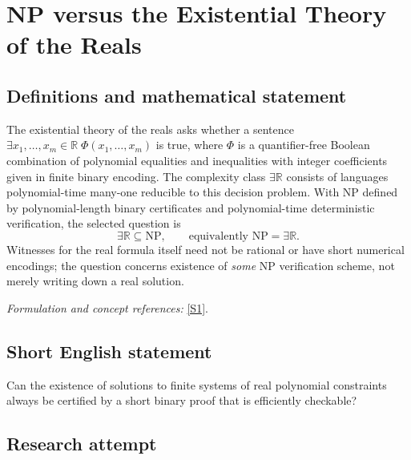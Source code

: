 \documentclass[11pt,a4paper]{article}
\newcommand{\R}{\mathbb{R}}
\newcommand{\sref}[2]{\hyperlink{source:#1:#2}{[S#2]}}
\newif\ifshowcatalogue
\newcommand{\cataloguescope}[1]{\ifshowcatalogue
 \paragraph{Exact scope in the supplied catalogue.}
 \begin{quote}\small #1\end{quote}\fi}
\numberwithin{equation}{section}
\begin{document}
\setcounter{section}{0}
\clearpage
\section*{\texorpdfstring{NP versus the Existential Theory of the Reals}{NP versus the Existential Theory of the Reals}}\label{30006759}
\subsection{Definitions and mathematical statement}
The existential theory of the reals asks whether a sentence
$\exists x_1,\ldots,x_m\in\R\;\Phi(x_1,\ldots,x_m)$ is true, where $\Phi$ is a quantifier-free Boolean combination of polynomial equalities and inequalities with integer coefficients given in finite binary encoding. The complexity class $\exists\R$ consists of languages polynomial-time many-one reducible to this decision problem. With $\mathrm{NP}$ defined by polynomial-length binary certificates and polynomial-time deterministic verification, the selected question is
\[
 \exists\R\subseteq\mathrm{NP},\qquad\text{equivalently }\mathrm{NP}=\exists\R.
\]
Witnesses for the real formula itself need not be rational or have short numerical encodings; the question concerns existence of \emph{some} NP verification scheme, not merely writing down a real solution.
\par\smallskip\textit{Formulation and concept references:} \sref{30006759}{1}.
\cataloguescope{Determine whether every problem decidable in the existential theory of the reals (exists R) can be decided in nondeterministic polynomial time, i.e., decide whether NP = exists R.}
\subsection{Short English statement}
Can the existence of solutions to finite systems of real polynomial constraints always be certified by a short binary proof that is efficiently checkable?
\subsection{Research attempt}
\end{document}
